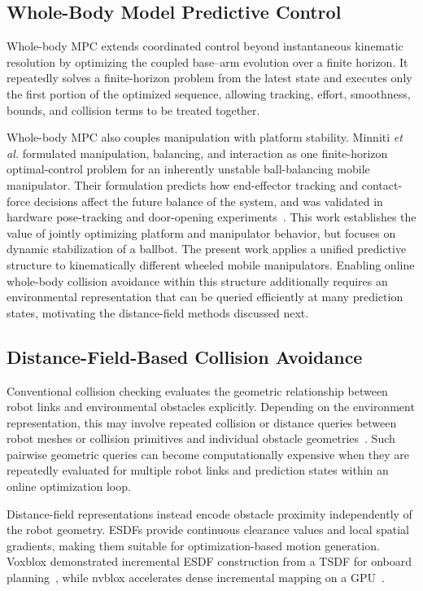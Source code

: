 \documentclass[conference]{IEEEtran}
\begin{document}
\subsection{Whole-Body Model Predictive Control}

Whole-body MPC extends coordinated control beyond instantaneous kinematic
resolution by optimizing the coupled base--arm evolution over a finite
horizon.  It repeatedly solves a finite-horizon problem from the latest state
and executes only the first portion of the optimized sequence, allowing
tracking, effort, smoothness, bounds, and collision terms to be treated
together.

Whole-body MPC also couples manipulation with platform stability.  Minniti
\emph{et al.} formulated manipulation, balancing, and interaction as one
finite-horizon optimal-control problem for an inherently unstable
ball-balancing mobile manipulator.  Their formulation predicts how
end-effector tracking and contact-force decisions affect the future balance of
the system, and was validated in hardware pose-tracking and door-opening
experiments~\cite{minniti2019wholebody}.  This work establishes the value of
jointly optimizing platform and manipulator behavior, but focuses on dynamic
stabilization of a ballbot.  The present work applies a unified predictive
structure to kinematically different wheeled mobile manipulators.  Enabling
online whole-body collision avoidance within this structure additionally
requires an environmental representation that can be queried efficiently at
many prediction states, motivating the distance-field methods discussed next.

\subsection{Distance-Field-Based Collision Avoidance}

Conventional collision checking evaluates the geometric relationship between
robot links and environmental obstacles explicitly. Depending on the
environment representation, this may involve repeated collision or distance
queries between robot meshes or collision primitives and individual obstacle
geometries~\cite{pan2012fcl}. Such pairwise geometric queries can become computationally
expensive when they are repeatedly evaluated for multiple robot links and
prediction states within an online optimization loop.

Distance-field representations instead encode obstacle proximity independently
of the robot geometry.  ESDFs provide continuous clearance values and local
spatial gradients, making them suitable for optimization-based motion
generation.  Voxblox demonstrated incremental ESDF construction from a TSDF
for onboard planning~\cite{oleynikova2017voxblox}, while nvblox accelerates
dense incremental mapping on a GPU~\cite{millane2023nvblox}.
\end{document}
